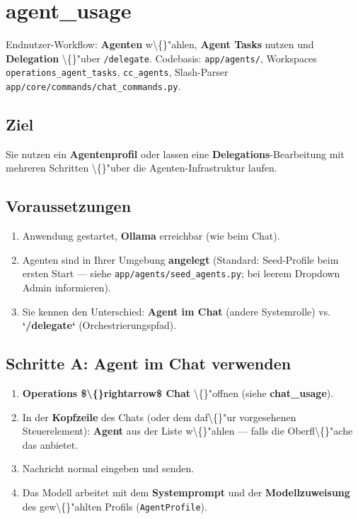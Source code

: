\section{agent\_usage}

Endnutzer-Workflow: \textbf{Agenten} w\textbackslash\{\}"ahlen, \textbf{Agent Tasks} nutzen und \textbf{Delegation} \textbackslash\{\}"uber \texttt{/delegate}. Codebasis: \texttt{app/agents/}, Workspaces \texttt{operations\_agent\_tasks}, \texttt{cc\_agents}, Slash-Parser \texttt{app/core/commands/chat\_commands.py}.

\subsection{Ziel}

Sie nutzen ein \textbf{Agentenprofil} oder lassen eine \textbf{Delegations}-Bearbeitung mit mehreren Schritten \textbackslash\{\}"uber die Agenten-Infrastruktur laufen.

\subsection{Voraussetzungen}

\begin{enumerate}
\item Anwendung gestartet, \textbf{Ollama} erreichbar (wie beim Chat).
\item Agenten sind in Ihrer Umgebung \textbf{angelegt} (Standard: Seed-Profile beim ersten Start --- siehe \texttt{app/agents/seed\_agents.py}; bei leerem Dropdown Admin informieren).
\item Sie kennen den Unterschied: \textbf{Agent im Chat} (andere Systemrolle) vs. \textbf{`/delegate`} (Orchestrierungspfad).
\end{enumerate}

\subsection{Schritte A: Agent im Chat verwenden}

\begin{enumerate}
\item \textbf{Operations \$\textbackslash\{\}rightarrow\$ Chat} \textbackslash\{\}"offnen (siehe \textbf{chat\_usage}).
\item In der \textbf{Kopfzeile} des Chats (oder dem daf\textbackslash\{\}"ur vorgesehenen Steuerelement): \textbf{Agent} aus der Liste w\textbackslash\{\}"ahlen --- falls die Oberfl\textbackslash\{\}"ache das anbietet.
\item Nachricht normal eingeben und senden.
\item Das Modell arbeitet mit dem \textbf{Systemprompt} und der \textbf{Modellzuweisung} des gew\textbackslash\{\}"ahlten Profils (\texttt{AgentProfile}).
\end{enumerate}

